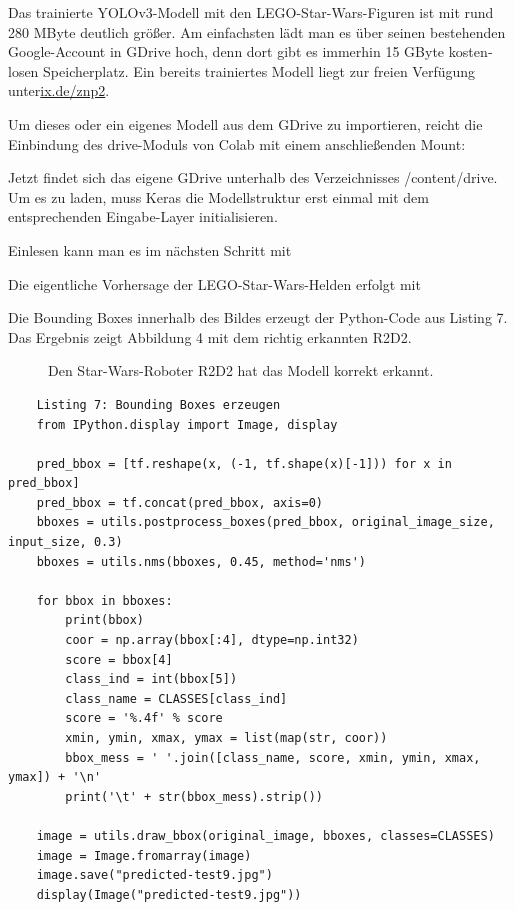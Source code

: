 
Das trainierte YOLOv3-Modell mit den LEGO-Star-Wars-Figuren ist mit rund 280 MByte deutlich größer. Am einfachsten lädt man es über seinen bestehenden Google-­Account in GDrive hoch, denn dort gibt es immerhin 15 GByte kosten­losen Speicherplatz. Ein bereits trainiertes Modell liegt zur freien Verfügung unter\url{ix.de/znp2}.
 
Um dieses oder ein eigenes Modell aus dem GDrive zu importieren, reicht die Einbindung des drive-Moduls von Colab mit einem anschließenden Mount: 



Jetzt findet sich das eigene GDrive unterhalb des Verzeichnisses /content/drive. Um es zu laden, muss Keras die Modellstruktur erst einmal mit dem entsprechenden Eingabe-Layer initialisieren. 


Einlesen kann man es im nächsten Schritt mit  


Die eigentliche Vorhersage der LEGO-Star-Wars-Helden erfolgt mit 




Die Bounding Boxes innerhalb des Bildes erzeugt der Python-Code aus Listing 7. Das Ergebnis zeigt Abbildung 4 mit dem richtig erkannten R2D2. 
	
\begin{figure}
	\caption{Den Star-Wars-Roboter R2D2 hat das Modell korrekt erkannt.}
\end{figure}	

	
\begin{lstlisting}
	Listing 7: Bounding Boxes erzeugen 
	from IPython.display import Image, display
	
	pred_bbox = [tf.reshape(x, (-1, tf.shape(x)[-1])) for x in pred_bbox]
	pred_bbox = tf.concat(pred_bbox, axis=0)
	bboxes = utils.postprocess_boxes(pred_bbox, original_image_size, input_size, 0.3)
	bboxes = utils.nms(bboxes, 0.45, method='nms')
	
	for bbox in bboxes:
	    print(bbox)
        coor = np.array(bbox[:4], dtype=np.int32)
        score = bbox[4]
        class_ind = int(bbox[5])
        class_name = CLASSES[class_ind]
        score = '%.4f' % score
        xmin, ymin, xmax, ymax = list(map(str, coor))
        bbox_mess = ' '.join([class_name, score, xmin, ymin, xmax, ymax]) + '\n'
        print('\t' + str(bbox_mess).strip())
	
	image = utils.draw_bbox(original_image, bboxes, classes=CLASSES)
	image = Image.fromarray(image)
	image.save("predicted-test9.jpg")
	display(Image("predicted-test9.jpg"))
\end{lstlisting}	



